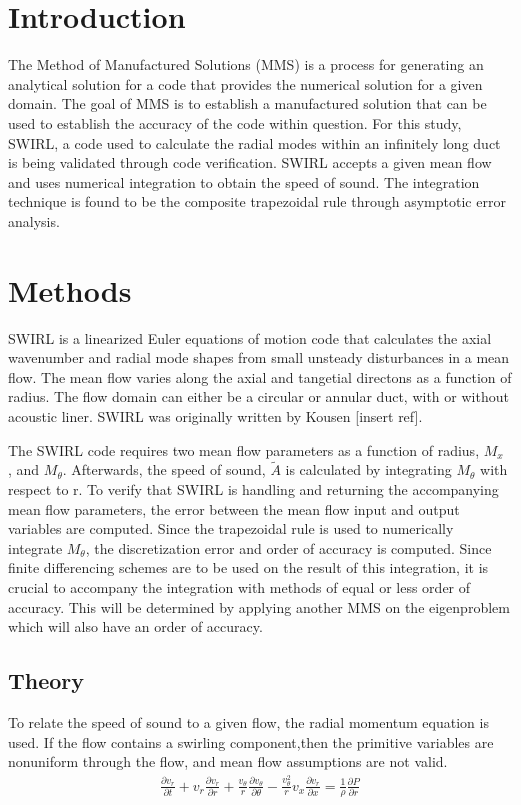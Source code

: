 \documentclass[12pt]{article}
\begin{document}
\section{Introduction}
The Method of Manufactured Solutions (MMS) is a process for generating an 
analytical solution for a code that provides the numerical solution for a 
given domain. The goal of MMS is to establish a manufactured solution that can 
be used to establish the accuracy of the code within question. For this study, 
SWIRL, a code used to calculate the radial modes within an infinitely long duct
is being validated through code verification. SWIRL accepts a given mean flow and 
uses numerical integration to obtain the speed of sound. The integration technique
is found to be the composite trapezoidal rule through asymptotic error analysis.


\section{Methods}

SWIRL is a linearized Euler equations of motion code that calculates the 
axial wavenumber and radial mode shapes from small unsteady disturbances in a mean flow. 
The mean flow varies along the axial and tangetial directons as a function of 
radius. The flow domain can either be a circular or annular duct, with or without
acoustic liner. SWIRL was originally written by Kousen [insert ref].

The SWIRL code requires two mean flow parameters as a function of radius, $M_x$
, and $M_{\theta}$. Afterwards, the speed of sound, $\widetilde{A}$ is calculated by 
integrating $M_{\theta}$ with respect to r. To verify that SWIRL is handling 
and returning the accompanying mean flow parameters, the error between the 
mean flow input and output variables are computed. Since the trapezoidal rule
is used to numerically integrate $M_{\theta}$, the discretization error and 
order of accuracy is computed. Since finite differencing schemes are to be used 
on the result of this integration, it is crucial to accompany the integration 
with methods of equal or less order of accuracy. This will be determined by 
applying another MMS on the eigenproblem which will also have an order of 
accuracy.

\subsection{Theory}

To relate the speed of sound to a given flow, the radial momentum equation
is used.  If the flow contains a swirling component,then the primitive variables 
are nonuniform through the flow, and mean flow assumptions are not valid. 
\begin{align*}
    \frac{\partial v_r}{\partial t} +
    v_r \frac{\partial v_r}{\partial r} + 
    \frac{v_{\theta}}{r} 
    \frac{\partial v_{\theta}}{\partial \theta} -
    \frac{v_{\theta}^2}{r} 
    v_x \frac{\partial v_r}{\partial x} =
    \frac{1}{\rho}\frac{\partial P}{\partial r}
\end{align*}
\end{document}
